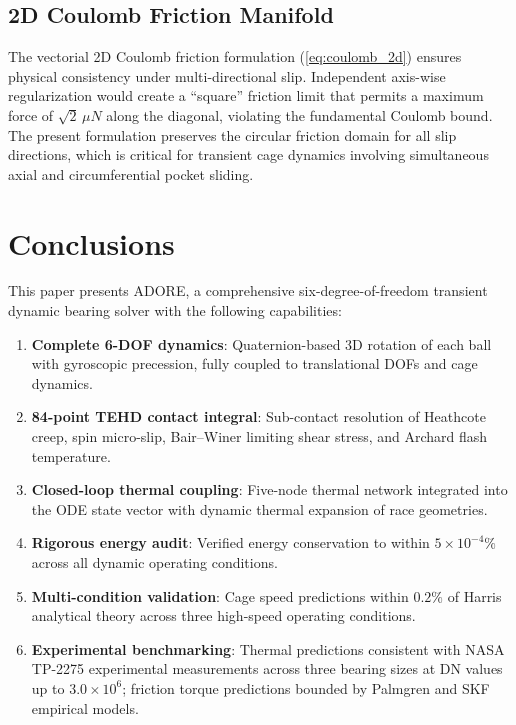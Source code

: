 \documentclass[preprint,12pt]{elsarticle}
\begin{document}
\subsection{2D Coulomb Friction Manifold}

The vectorial 2D Coulomb friction formulation (\cref{eq:coulomb_2d}) ensures physical consistency under multi-directional slip. Independent axis-wise regularization would create a ``square'' friction limit that permits a maximum force of $\sqrt{2}\,\mu N$ along the diagonal, violating the fundamental Coulomb bound. The present formulation preserves the circular friction domain for all slip directions, which is critical for transient cage dynamics involving simultaneous axial and circumferential pocket sliding.


\section{Conclusions}
\label{sec:conclusion}

This paper presents ADORE, a comprehensive six-degree-of-freedom transient dynamic bearing solver with the following capabilities:

\begin{enumerate}
    \item \textbf{Complete 6-DOF dynamics}: Quaternion-based 3D rotation of each ball with gyroscopic precession, fully coupled to translational DOFs and cage dynamics.
    \item \textbf{84-point TEHD contact integral}: Sub-contact resolution of Heathcote creep, spin micro-slip, Bair--Winer limiting shear stress, and Archard flash temperature.
    \item \textbf{Closed-loop thermal coupling}: Five-node thermal network integrated into the ODE state vector with dynamic thermal expansion of race geometries.
    \item \textbf{Rigorous energy audit}: Verified energy conservation to within $5 \times 10^{-4}\%$ across all dynamic operating conditions.
    \item \textbf{Multi-condition validation}: Cage speed predictions within $0.2\%$ of Harris analytical theory across three high-speed operating conditions.
    \item \textbf{Experimental benchmarking}: Thermal predictions consistent with NASA TP-2275 experimental measurements across three bearing sizes at DN values up to $3.0 \times 10^6$; friction torque predictions bounded by Palmgren and SKF empirical models.
\end{enumerate}
\end{document}
